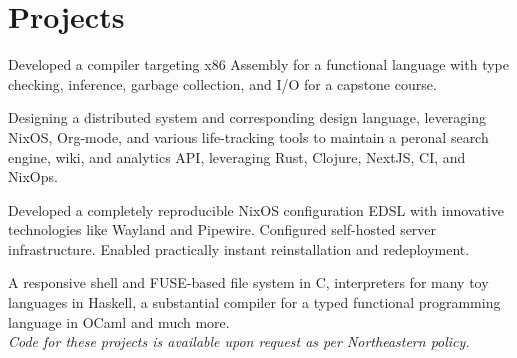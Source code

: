 \documentclass[letterpaper]{cv} %
\begin{document}
\begin{minipage}[t]{0.66\textwidth}
  \section{Projects}

  Developed a compiler targeting x86 Assembly for a functional language with type checking, inference, garbage collection, and  I/O for a capstone course.
  \sectionspace

  Designing a distributed system and corresponding design language, leveraging NixOS, Org-mode, and various life-tracking tools to maintain a peronal search engine, wiki, and analytics API, leveraging Rust, Clojure, NextJS, CI, and NixOps.
  \sectionspace

  Developed a completely reproducible NixOS configuration EDSL with innovative technologies like Wayland and Pipewire. Configured self-hosted server infrastructure. Enabled practically instant reinstallation and redeployment.\@ \sectionspace

  A responsive shell and FUSE-based file system in C,
  interpreters for many toy languages in Haskell,
  a substantial compiler for a typed functional programming language in OCaml and much more. \\
  \textit{Code for these projects is available upon request as per Northeastern policy.}

\end{minipage} %
\end{document}
